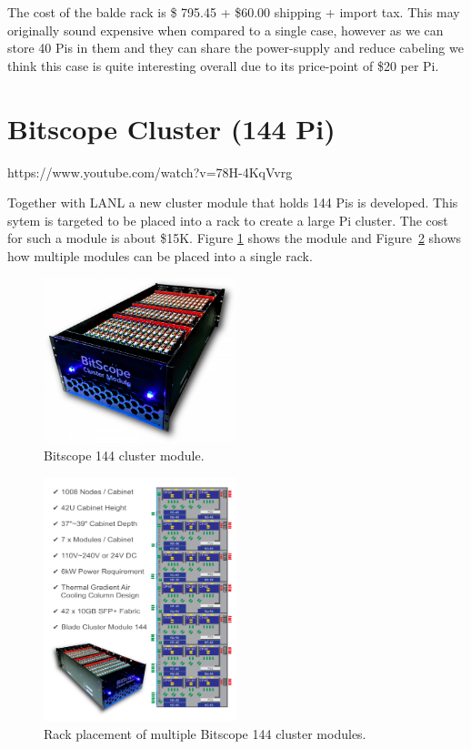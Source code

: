 The cost of the balde rack is \$ 795.45 + \$60.00 shipping + import tax.
This may originally sound expensive when compared to a single case,
however as we can store 40 Pis in them and they can share the
power-supply and reduce cabeling we think this case is quite interesting
overall due to its price-point of \$20 per Pi.



\section{Bitscope Cluster (144 Pi)}\label{bitscope-cluster-144-pi}

https://www.youtube.com/watch?v=78H-4KqVvrg

Together with LANL a new cluster module that holds 144 Pis is developed.
This sytem is targeted to be placed into a rack to create a large Pi
cluster. The cost for such a module is about \$15K. Figure
\ref{F:pi-mod-1} shows the
module and Figure~\ref{F:pi-mod-2} shows how multiple modules can be placed into a
single rack.

\begin{figure}
\centering
\includegraphics[width=0.5\textwidth]{images/cluster-module.png}
\caption{Bitscope 144 cluster module.}\label{F:pi-mod-1}
\end{figure}

\begin{figure}
\centering
\includegraphics[width=0.5\textwidth]{images/rack-overview.png}
\caption{Rack placement of multiple Bitscope 144 cluster modules.}\label{F:pi-mod-2}
\end{figure}




